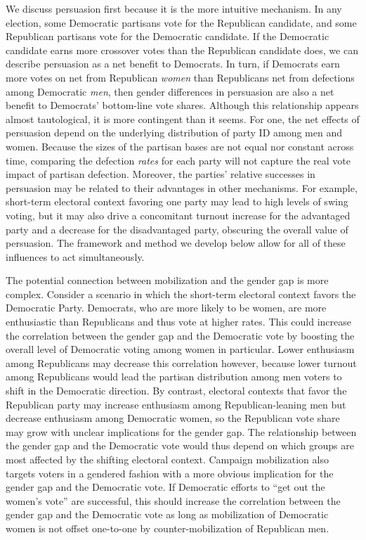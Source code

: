 \documentclass[12pt
               ,final
               ]{article}
\begin{document}
We discuss persuasion first because it is the more intuitive mechanism. In any election, some Democratic partisans vote for the Republican candidate, and some Republican partisans vote for the Democratic candidate. If the Democratic candidate earns more crossover votes than the Republican candidate does, we can describe persuasion as a net benefit to Democrats. In turn, if Democrats earn more votes on net from Republican \emph{women} than Republicans net from defections among Democratic \emph{men}, then gender differences in persuasion are also a net benefit to Democrats' bottom-line vote shares. Although this relationship appears almost tautological, it is more contingent than it seems. For one, the net effects of persuasion depend on the underlying distribution of party ID among men and women. Because the sizes of the partisan bases are not equal nor constant across time, comparing the defection \emph{rates} for each party will not capture the real vote impact of partisan defection. Moreover, the parties' relative successes in persuasion may be related to their advantages in other mechanisms. For example, short-term electoral context favoring one party may lead to high levels of swing voting, but it may also drive a concomitant turnout increase for the advantaged party and a decrease for the disadvantaged party, obscuring the overall value of persuasion. The framework and method we develop below allow for all of these influences to act simultaneously.

The potential connection between mobilization and the gender gap is more complex. Consider a scenario in which the short-term electoral context favors the Democratic Party. Democrats, who are more likely to be women, are more enthusiastic than Republicans and thus vote at higher rates. This could increase the correlation between the gender gap and the Democratic vote by boosting the overall level of Democratic voting among women in particular. Lower enthusiasm among Republicans may decrease this correlation however, because lower turnout among Republicans would lead the partisan distribution among men voters to shift in the Democratic direction. By contrast, electoral contexts that favor the Republican party may increase enthusiasm among Republican-leaning men but decrease enthusiasm among Democratic women, so the Republican vote share may grow with unclear implications for the gender gap. The relationship between the gender gap and the Democratic vote would thus depend on which groups are most affected by the shifting electoral context. Campaign mobilization also targets voters in a gendered fashion with a more obvious implication for the gender gap and the Democratic vote. If Democratic efforts to ``get out the women's vote'' are successful, this should increase the correlation between the gender gap and the Democratic vote as long as mobilization of Democratic women is not offset one-to-one by counter-mobilization of Republican men. 
\end{document}
